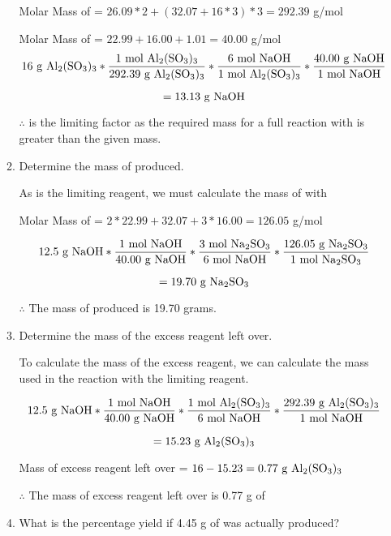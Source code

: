\documentclass[10pt]{article}
\begin{document}
\begin{enumerate}
\begin{enumerate}
        Molar Mass of  = $26.09*2+(32.07+16*3)*3=292.39$ g/mol

        Molar Mass of  = $22.99+16.00+1.01=40.00$ g/mol
        $$16\text{ g }\ce{Al2(SO3)3}*\frac{1\text{ mol }\ce{Al2(SO3)3}}{292.39\text{ g }\ce{Al2(SO3)3}}*\frac{6\text{ mol }\ce{NaOH}}{1\text{ mol }\ce{Al2(SO3)3}}*\frac{40.00\text{ g }\ce{NaOH}}{1\text{ mol }\ce{NaOH}}$$

        $$=13.13\text{ g }\ce{NaOH}$$

        $\therefore$  is the limiting factor as the required mass for a full reaction with  is greater than the given mass.
        \bigskip
        \item Determine the mass of  produced.
        \medskip

        As  is the limiting reagent, we must calculate the mass of  with 
        \medskip

        Molar Mass of  = $2*22.99+32.07+3*16.00=126.05$ g/mol

        $$12.5\text{ g }\ce{NaOH}*\frac{1\text{ mol }\ce{NaOH}}{40.00\text{ g }\ce{NaOH}}*\frac{3\text{ mol }\ce{Na2SO3}}{6\text{ mol }\ce{NaOH}}*\frac{126.05\text{ g }\ce{Na2SO3}}{1\text{ mol }\ce{Na2SO3}}$$

        $$=19.70\text{ g }\ce{Na2SO3}$$

        $\therefore$ The mass of  produced is 19.70 grams.
        \bigskip
        \item Determine the mass of the excess reagent left over.
        \medskip

        To calculate the mass of the excess reagent, we can calculate the mass used in the reaction with the limiting reagent.

        $$12.5\text{ g }\ce{NaOH}*\frac{1\text{ mol }\ce{NaOH}}{40.00\text{ g }\ce{NaOH}}*\frac{1\text{ mol }\ce{Al2(SO3)3}}{6\text{ mol }\ce{NaOH}}*\frac{292.39\text{ g }\ce{Al2(SO3)3}}{1\text{ mol }\ce{NaOH}}$$

        $$=15.23\text{ g }\ce{Al2(SO3)3}$$

        Mass of excess reagent left over = $16-15.23=0.77\text{ g }\ce{Al2(SO3)3}$

        $\therefore$ The mass of excess reagent left over is 0.77 g of 
        \bigskip
        \item What is the percentage yield if 4.45 g of  was actually produced? 
        

\end{enumerate}
\end{enumerate}
\end{document}
